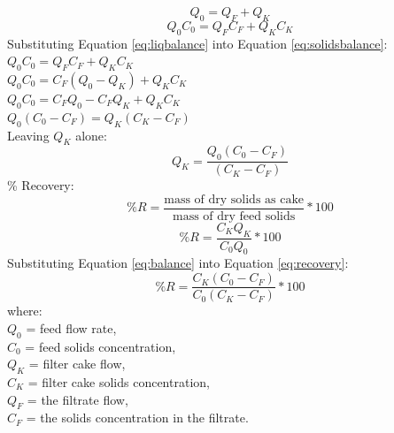 \documentclass{article}
\numberwithin{equation}{section}
\begin{document}
\begin{equation}
    Q_0 = Q_F + Q_K
    \label{eq:liqbalance}
\end{equation}
\begin{equation}
    Q_0C_0 = Q_FC_F + Q_KC_K
    \label{eq:solidsbalance}
\end{equation}
Substituting Equation \ref{eq:liqbalance} into Equation \ref{eq:solidsbalance}:\\
$Q_0C_0 = Q_FC_F + Q_KC_K$\\
$Q_0C_0 = C_F(Q_0-Q_K) + Q_KC_K$\\
$Q_0C_0 = C_FQ_0-C_FQ_K+ Q_KC_K$\\
$Q_0 (C_0-C_F) = Q_K (C_K-C_F) $\\
Leaving $Q_K$ alone:
\begin{equation}
    Q_K=\frac{Q_0(C_0-C_F)}{(C_K-C_F)}
    \label{eq:balance}
\end{equation}
\% Recovery:
\[
\%R =\frac{\text{mass of dry solids as cake}}{\text{mass of dry feed solids}}*100
\]
\begin{equation}
    \%R =\frac{C_KQ_K}{C_0Q_0}*100
    \label{eq:recovery}
\end{equation}
Substituting Equation \ref{eq:balance} into Equation \ref{eq:recovery}:
\[
\%R =\frac{C_K(C_0-C_F)}{C_0(C_K-C_F)}*100
\]
where:\\
$Q_0$ = feed flow rate,\\
$C_0$ = feed solids concentration,\\
$Q_K$ = filter cake flow,\\
$C_K$ = filter cake solids concentration,\\
$Q_F$ = the filtrate flow,\\
$C_F$ = the solids concentration in the filtrate.
\end{document}
